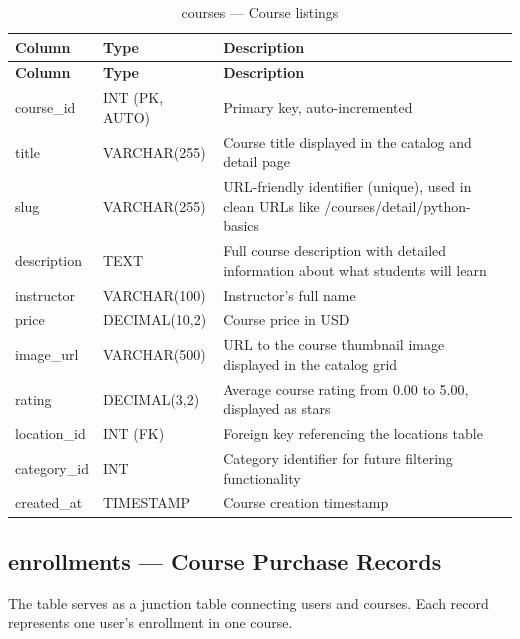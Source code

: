 \documentclass[12pt,a4paper]{report}
\begin{document}
\begin{longtable}{|p{3.5cm}|p{3cm}|p{7cm}|}
    \caption{courses — Course listings}
    \label{tab:courses} \\
    \toprule
    \textbf{Column} & \textbf{Type} & \textbf{Description} \\
    \midrule
    \endfirsthead
    \toprule
    \textbf{Column} & \textbf{Type} & \textbf{Description} \\
    \midrule
    \endhead
    course\_id & INT (PK, AUTO) & Primary key, auto-incremented \\
    title & VARCHAR(255) & Course title displayed in the catalog and detail page \\
    slug & VARCHAR(255) & URL-friendly identifier (unique), used in clean URLs like /courses/detail/python-basics \\
    description & TEXT & Full course description with detailed information about what students will learn \\
    instructor & VARCHAR(100) & Instructor's full name \\
    price & DECIMAL(10,2) & Course price in USD \\
    image\_url & VARCHAR(500) & URL to the course thumbnail image displayed in the catalog grid \\
    rating & DECIMAL(3,2) & Average course rating from 0.00 to 5.00, displayed as stars \\
    location\_id & INT (FK) & Foreign key referencing the locations table \\
    category\_id & INT & Category identifier for future filtering functionality \\
    created\_at & TIMESTAMP & Course creation timestamp \\
    \bottomrule
\end{longtable}

\subsection{enrollments — Course Purchase Records}

The  table serves as a junction table connecting users and courses. Each record represents one user's enrollment in one course.
\end{document}
